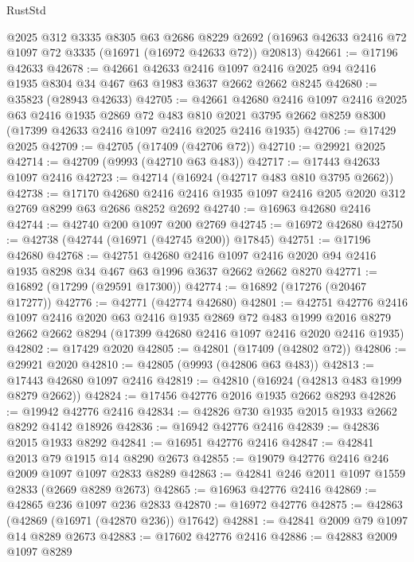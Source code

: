 \begin{lexlean}{RustStd}
\begin{coremodule}
    @2025
    @312
    @3335
    @8305
    @63
    @2686
    @8229
    @2692
    (@16963 @42633 @2416 @72 @1097 @72 @3335 (@16971 (@16972 @42633 @72)) @20813)
@42661 := @17196 @42633
@42678 := @42661
    @42633
    @2416
    @1097
    @2416
    @2025
    @94
    @2416
    @1935
    @8304
    @34
    @467
    @63
    @1983
    @3637
    @2662
    @2662
    @8245
@42680 := @35823 (@28943 @42633)
@42705 := @42661
    @42680
    @2416
    @1097
    @2416
    @2025
    @63
    @2416
    @1935
    @2869
    @72
    @483
    @810
    @2021
    @3795
    @2662
    @8259
    @8300
    (@17399 @42633 @2416 @1097 @2416 @2025 @2416 @1935)
@42706 := @17429 @2025
@42709 := @42705 (@17409 (@42706 @72))
@42710 := @29921 @2025
@42714 := @42709 (@9993 (@42710 @63 @483))
@42717 := @17443 @42633 @1097 @2416
@42723 := @42714 (@16924 (@42717 @483 @810 @3795 @2662))
@42738 := @17170
    @42680
    @2416
    @2416
    @1935
    @1097
    @2416
    @205
    @2020
    @312
    @2769
    @8299
    @63
    @2686
    @8252
    @2692
@42740 := @16963 @42680 @2416
@42744 := @42740 @200 @1097 @200 @2769
@42745 := @16972 @42680
@42750 := @42738 (@42744 (@16971 (@42745 @200)) @17845)
@42751 := @17196 @42680
@42768 := @42751
    @42680
    @2416
    @1097
    @2416
    @2020
    @94
    @2416
    @1935
    @8298
    @34
    @467
    @63
    @1996
    @3637
    @2662
    @2662
    @8270
@42771 := @16892 (@17299 (@29591 @17300))
@42774 := @16892 (@17276 (@20467 @17277))
@42776 := @42771 (@42774 @42680)
@42801 := @42751
    @42776
    @2416
    @1097
    @2416
    @2020
    @63
    @2416
    @1935
    @2869
    @72
    @483
    @1999
    @2016
    @8279
    @2662
    @2662
    @8294
    (@17399 @42680 @2416 @1097 @2416 @2020 @2416 @1935)
@42802 := @17429 @2020
@42805 := @42801 (@17409 (@42802 @72))
@42806 := @29921 @2020
@42810 := @42805 (@9993 (@42806 @63 @483))
@42813 := @17443 @42680 @1097 @2416
@42819 := @42810 (@16924 (@42813 @483 @1999 @8279 @2662))
@42824 := @17456 @42776 @2016 @1935 @2662 @8293
@42826 := @19942 @42776 @2416
@42834 := @42826 @730 @1935 @2015 @1933 @2662 @8292 @4142 @18926
@42836 := @16942 @42776 @2416
@42839 := @42836 @2015 @1933 @8292
@42841 := @16951 @42776 @2416
@42847 := @42841 @2013 @79 @1915 @14 @8290 @2673
@42855 := @19079 @42776 @2416 @246 @2009 @1097 @1097 @2833 @8289
@42863 := @42841 @246 @2011 @1097 @1559 @2833 (@2669 @8289 @2673)
@42865 := @16963 @42776 @2416
@42869 := @42865 @236 @1097 @236 @2833
@42870 := @16972 @42776
@42875 := @42863 (@42869 (@16971 (@42870 @236)) @17642)
@42881 := @42841 @2009 @79 @1097 @14 @8289 @2673
@42883 := @17602 @42776 @2416
@42886 := @42883 @2009 @1097 @8289

\end{coremodule}
\end{lexlean}
